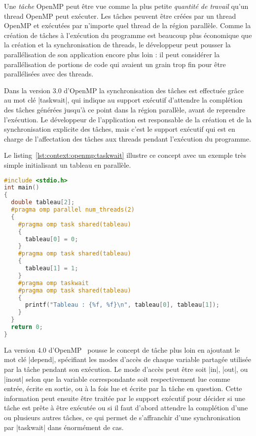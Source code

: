 Une \emph{tâche} OpenMP peut être vue comme la plus petite \emph{quantité de travail} qu'un thread OpenMP peut exécuter.
Les tâches peuvent être créées par un thread OpenMP et exécutées par n'importe quel thread de la région parallèle.
Comme la création de tâches à l'exécution du programme est beaucoup plus économique que la création et la synchronisation de threads, le développeur peut pousser la parallélisation de son application encore plus loin : il peut considérer la parallélisation de portions de code qui avaient un grain trop fin pour être parallélisées avec des threads.

Dans la version 3.0 d'OpenMP la synchronisation des tâches est effectuée grâce au mot clé |taskwait|, qui indique au support exécutif d'attendre la complétion des tâches générées jusqu'à ce point dans la région parallèle, avant de reprendre l'exécution.
Le développeur de l'application est responsable de la création et de la synchronisation explicite des tâches, mais c'est le support exécutif qui est en charge de l'affectation des tâches aux threads pendant l'exécution du programme.

Le listing~\ref{lst:context:openmp:taskwait} illustre ce concept avec un exemple très simple initialisant un tableau en parallèle.

\begin{lstlisting}[language=c++,caption=Création et synchronisation explicite de tâches,label=lst:context:openmp:taskwait]
#include <stdio.h>
int main()
{
  double tableau[2];
  #pragma omp parallel num_threads(2)
  {
    #pragma omp task shared(tableau)
    {
      tableau[0] = 0;
    }
    #pragma omp task shared(tableau)
    {
      tableau[1] = 1;
    }
    #pragma omp taskwait
    #pragma omp task shared(tableau)
    {
      printf("Tableau : {%f, %f}\n", tableau[0], tableau[1]);
    }
  }
  return 0;
}
\end{lstlisting}


La version 4.0 d'OpenMP~\cite{openmp40} pousse le concept de tâche plus loin en ajoutant le mot clé |depend|, spécifiant les modes d'accès de chaque variable partagée utilisée par la tâche pendant son exécution.
Le mode d'accès peut être soit |in|, |out|, ou |inout| selon que la variable correspondante soit respectivement lue comme entrée, écrite en sortie, ou à la fois lue et écrite par la tâche en question.
Cette information peut ensuite être traitée par le support exécutif pour décider si une tâche est prête à être exécutée ou si il faut d'abord attendre la complétion d'une ou plusieurs autres tâches, ce qui permet de s'affranchir d'une synchronisation par |taskwait| dans énormément de cas.

